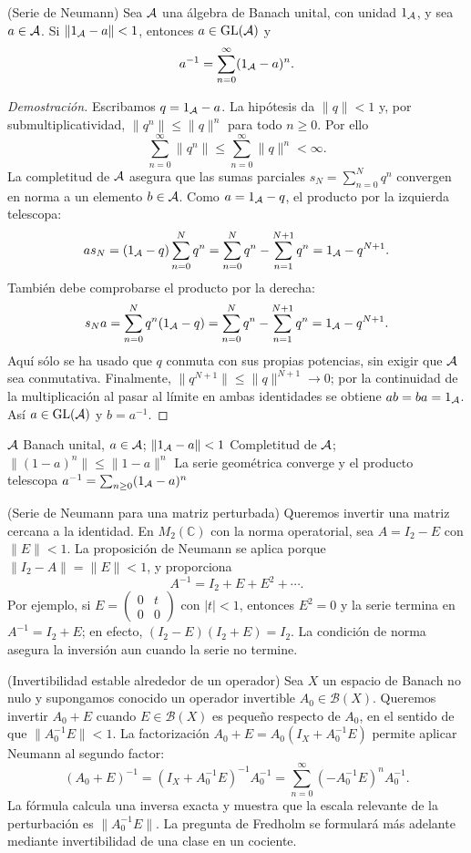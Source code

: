 \begin{cthproposicion}{(Serie de Neumann)}
Sea $\mathcal A$ una álgebra de Banach unital, con unidad $1_\mathcal A$, y sea $a\in\mathcal A$.
Si $\|1_\mathcal A-a\|<1$, entonces $a\in\operatorname{GL}(\mathcal A)$ y
\[
 a^{-1}=\sum_{n=0}^{\infty}(1_\mathcal A-a)^n.
\]
\end{cthproposicion}

\begin{proof}[Demostración]
Escribamos $q=1_\mathcal A-a$. La hipótesis da $\|q\|<1$ y, por submultiplicatividad,
$\|q^n\|\le\|q\|^n$ para todo $n\ge0$. Por ello
\[
 \sum_{n=0}^{\infty}\|q^n\|
 \le \sum_{n=0}^{\infty}\|q\|^n<\infty.
\]
La completitud de $\mathcal A$ asegura que las sumas parciales
$s_N=\sum_{n=0}^{N}q^n$ convergen en norma a un elemento $b\in\mathcal A$.
Como $a=1_\mathcal A-q$, el producto por la izquierda telescopa:
\[
 as_N=(1_\mathcal A-q)\sum_{n=0}^{N}q^n
 =\sum_{n=0}^{N}q^n-\sum_{n=1}^{N+1}q^n
 =1_\mathcal A-q^{N+1}.
\]
También debe comprobarse el producto por la derecha:
\[
 s_Na=\sum_{n=0}^{N}q^n(1_\mathcal A-q)
 =\sum_{n=0}^{N}q^n-\sum_{n=1}^{N+1}q^n
 =1_\mathcal A-q^{N+1}.
\]
Aquí sólo se ha usado que $q$ conmuta con sus propias potencias, sin exigir que
$\mathcal A$ sea conmutativa. Finalmente,
$\|q^{N+1}\|\le\|q\|^{N+1}\to0$; por la continuidad de la
multiplicación al pasar al límite en ambas identidades se obtiene
$ab=ba=1_\mathcal A$. Así $a\in\operatorname{GL}(\mathcal A)$ y $b=a^{-1}$.
\end{proof}

\proofdiagram
{$\mathcal A$ Banach unital, $a\in\mathcal A$; $\|1_\mathcal A-a\|<1$}
{Completitud de $\mathcal A$; $\|(1-a)^n\|\le\|1-a\|^n$}
{La serie geométrica converge y el producto telescopa}
{$a^{-1}=\sum_{n\ge0}(1_\mathcal A-a)^n$}

\begin{cthejemplo}{(Serie de Neumann para una matriz perturbada)}
Queremos invertir una matriz cercana a la identidad. En
$M_2(\mathbb C)$ con la norma operatorial, sea $A=I_2-E$ con
$\|E\|<1$. La proposición de Neumann se aplica porque
$\|I_2-A\|=\|E\|<1$, y proporciona
\[
 A^{-1}=I_2+E+E^2+\cdots.
\]
Por ejemplo, si
$E=\begin{pmatrix}0&t\\0&0\end{pmatrix}$ con $|t|<1$,
entonces $E^2=0$ y la serie termina en
$A^{-1}=I_2+E$; en efecto, $(I_2-E)(I_2+E)=I_2$.
La condición de norma asegura la inversión aun cuando la serie no termine.
\end{cthejemplo}

\begin{cthejemplo}{(Invertibilidad estable alrededor de un operador)}
Sea $X$ un espacio de Banach no nulo y supongamos conocido un operador
invertible $A_0\in\mathcal B(X)$. Queremos invertir $A_0+E$ cuando
$E\in\mathcal B(X)$ es pequeño respecto de $A_0$, en el sentido de que
$\|A_0^{-1}E\|<1$. La factorización
$A_0+E=A_0(I_X+A_0^{-1}E)$ permite aplicar Neumann al segundo factor:
\[
 (A_0+E)^{-1}=(I_X+A_0^{-1}E)^{-1}A_0^{-1}
 =\sum_{n=0}^{\infty}(-A_0^{-1}E)^n A_0^{-1}.
\]
La fórmula calcula una inversa exacta y muestra que la escala relevante de
la perturbación es $\|A_0^{-1}E\|$. La pregunta de Fredholm se formulará más
adelante mediante invertibilidad de una clase en un cociente.
\end{cthejemplo}

